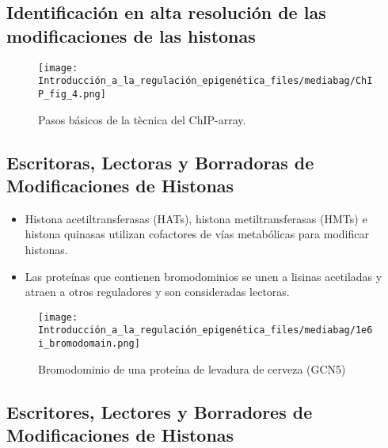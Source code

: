 \documentclass[
  letterpaper,
  DIV=11,
  numbers=noendperiod]{scrartcl}
\providecommand{\tightlist}{%
  \setlength{\itemsep}{0pt}\setlength{\parskip}{0pt}}\usepackage{longtable,booktabs,array}
\begin{document}
\subsection{Identificación en alta resolución de las modificaciones de
las
histonas}\label{identificaciuxf3n-en-alta-resoluciuxf3n-de-las-modificaciones-de-las-histonas-1}

\begin{figure}[H]

{\centering \texttt{[image: Introducción\_a\_la\_regulación\_epigenética\_files/mediabag/ChIP\_fig\_4.png]}

}

\caption{Pasos básicos de la tècnica del ChIP-array.}

\end{figure}%

\subsection{Escritoras, Lectoras y Borradoras de Modificaciones de
Histonas}\label{escritoras-lectoras-y-borradoras-de-modificaciones-de-histonas}

\begin{itemize}
\tightlist
\item
  Histona acetiltransferasas (HATs), histona metiltransferasas (HMTs) e
  histona quinasas utilizan cofactores de vías metabólicas para
  modificar histonas.
\item
  Las proteínas que contienen bromodominios se unen a lisinas acetiladas
  y atraen a otros reguladores y son consideradas lectoras.
\end{itemize}

\begin{figure}[H]

{\centering \texttt{[image: Introducción\_a\_la\_regulación\_epigenética\_files/mediabag/1e6i\_bromodomain.png]}

}

\caption{Bromodominio de una proteína de levadura de cerveza (GCN5)}

\end{figure}%

\subsection{Escritores, Lectores y Borradores de Modificaciones de
Histonas}\label{escritores-lectores-y-borradores-de-modificaciones-de-histonas}
\end{document}

